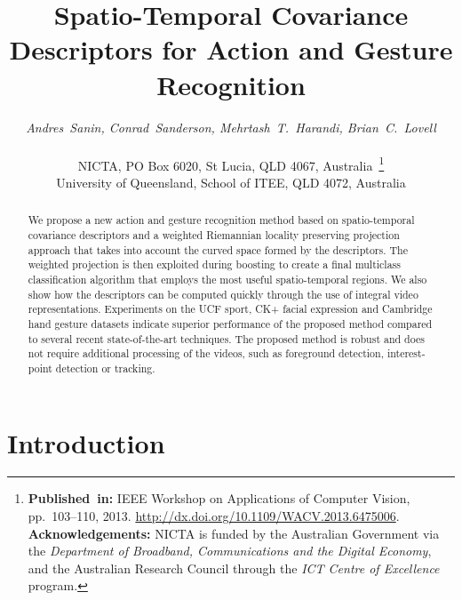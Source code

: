 \documentclass[10pt,twocolumn,letterpaper]{article}
\begin{document}
\title{Spatio-Temporal Covariance Descriptors for Action and Gesture Recognition}

\author
  {
  {\it Andres~Sanin, Conrad~Sanderson, Mehrtash~T.~Harandi, Brian~C.~Lovell}\\
  ~\\
  NICTA, PO Box 6020, St Lucia, QLD 4067, Australia~\thanks
    {{\bf Published~in:} IEEE Workshop on Applications of Computer \mbox{Vision}, pp.~103--110, 2013.
    \href{\bf http://dx.doi.org/10.1109/WACV.2013.6475006}{http://dx.doi.org/10.1109/WACV.2013.6475006}.
    {\tiny \mbox{\bf Acknowledgements:} NICTA is funded by the Australian Government via the {\it Department of Broadband, Communications and the Digital Economy}, and the Australian Research Council through the {\it ICT Centre of Excellence} program.}}
  \\
  University of Queensland, School of ITEE, QLD 4072, Australia}

\maketitle
\thispagestyle{empty}

\begin{abstract}
\vspace{-2ex}

\noindent
We propose a new action and gesture recognition method based on spatio-temporal covariance descriptors
and a weighted Riemannian locality preserving projection approach
that takes into account the curved space formed by the descriptors.
The weighted projection is then exploited during boosting to create
a final multiclass classification algorithm that employs the most useful spatio-temporal regions.
We also show how the descriptors can be computed quickly through the use of integral video representations.
Experiments on the UCF sport, CK+ facial expression and Cambridge hand gesture datasets
indicate superior performance of the proposed method
compared to several recent state-of-the-art techniques.
The proposed method is robust and does not require additional processing of the videos,
such as foreground detection, interest-point detection or tracking. 







\end{abstract}
\vspace{-1ex}
\section{Introduction}
\label{sec:introduction}
\end{document}
